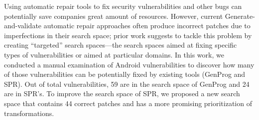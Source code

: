 Using automatic repair tools to fix security vulnerabilities and other bugs can potentially save companies great amount of resources. However, current Generate-and-validate automatic repair approaches often produce incorrect patches due to imperfections in their search space; prior work suggests to tackle this problem by creating ``targeted'' search spaces---the search spaces aimed at fixing specific types of vulnerabilities or aimed at particular domains. In this work, we conducted a manual examination of \numvuln Android vulnerabilities to discover how many of those vulnerabilities can be potentially fixed by existing tools (GenProg and SPR). Out of total \numvuln vulnerabilities, 59 are in the search space of GenProg and 24 are in SPR's. To improve the search space of SPR, we proposed a new search space that contains 44 correct patches and has a more promising prioritization of transformations.
